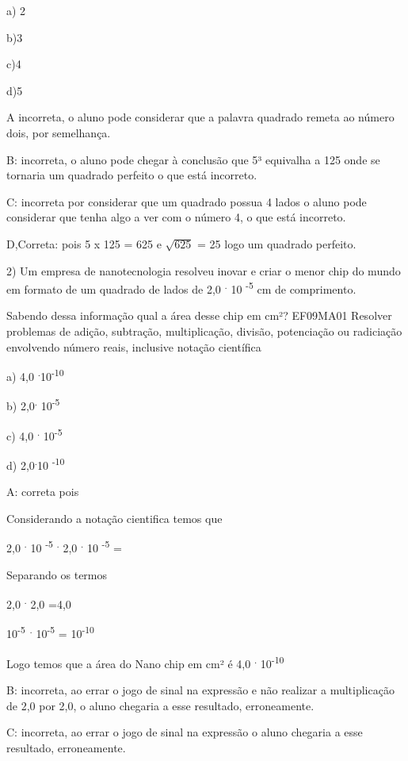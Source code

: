 {a) 2

b)3

c)4

d)5

A incorreta, o aluno pode considerar que a palavra quadrado remeta ao
número dois, por semelhança.

B: incorreta, o aluno pode chegar à conclusão que 5³ equivalha a 125
onde se tornaria um quadrado perfeito o que está incorreto.

C: incorreta por considerar que um quadrado possua 4 lados o aluno pode
considerar que tenha algo a ver com o número 4, o que está incorreto.

D,Correta: pois 5 x 125 = 625 e \(\sqrt{625}\) = 25 logo um quadrado
perfeito.

2) Um empresa de nanotecnologia resolveu inovar e criar o menor chip do
mundo em formato de um quadrado de lados de 2,0 \textsuperscript{.} 10
\textsuperscript{-5} cm de comprimento.

Sabendo dessa informação qual a área desse chip em cm²? EF09MA01
Resolver problemas de adição, subtração, multiplicação, divisão,
potenciação ou radiciação envolvendo número reais, inclusive notação
científica

a) 4,0 \textsuperscript{.}10\textsuperscript{-10}

b) 2,0\textsuperscript{.} 10\textsuperscript{-5}

c) 4,0 \textsuperscript{.} 10\textsuperscript{-5}

d) 2,0\textsuperscript{.}10 \textsuperscript{-10}

A: correta pois

Considerando a notação cientifica temos que

2,0 \textsuperscript{.} 10 \textsuperscript{-5} \textsuperscript{.} 2,0
\textsuperscript{.} 10 \textsuperscript{-5} =

Separando os termos

2,0 \textsuperscript{.} 2,0 =4,0

10\textsuperscript{-5~.} 10\textsuperscript{-5} =
10\textsuperscript{-10}

Logo temos que a área do Nano chip em cm² é 4,0 \textsuperscript{.}
10\textsuperscript{-10}

B: incorreta, ao errar o jogo de sinal na expressão e não realizar a
multiplicação de 2,0 por 2,0, o aluno chegaria a esse resultado,
erroneamente.

C: incorreta, ao errar o jogo de sinal na expressão o aluno chegaria a
esse resultado, erroneamente.

}
